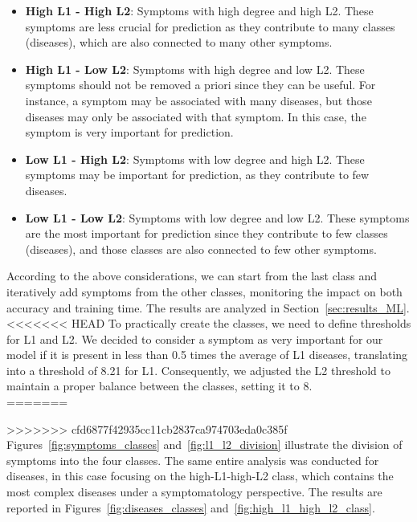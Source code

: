 \begin{itemize}
    \setlength\itemsep{1em}
    \item \textbf{High L1 - High L2}: Symptoms with high degree and high L2. These symptoms are less crucial for
          prediction as they contribute to many classes (diseases), which are also connected to many other symptoms.
    \item \textbf{High L1 - Low L2}: Symptoms with high degree and low L2. These symptoms should not be removed a
          priori since they can be useful. For instance, a symptom may be associated with many diseases, but those
          diseases may only be associated with that symptom. In this case, the symptom is very important for prediction.
    \item \textbf{Low L1 - High L2}: Symptoms with low degree and high L2. These symptoms may be important for
          prediction, as they contribute to few diseases.
    \item \textbf{Low L1 - Low L2}: Symptoms with low degree and low L2. These symptoms are the most important
          for prediction since they contribute to few classes (diseases), and those classes are also connected to
          few other symptoms.
\end{itemize}

\noindent
According to the above considerations, we can start from the last class and iteratively add symptoms from the
other classes, monitoring the impact on both accuracy and training time.
The results are analyzed in Section~\ref{sec:results_ML}.\\
<<<<<<< HEAD
To practically create the classes, we need to define thresholds for L1 and L2. We decided to consider
a symptom as very important for our model if it is present in less than 0.5 times the average of L1 diseases,
translating into a threshold of 8.21 for L1. Consequently, we adjusted the L2 threshold to maintain a proper balance
between the classes, setting it to 8.\\
=======

>>>>>>> cfd6877f42935cc11cb2837ca974703eda0c385f
Figures~\ref{fig:symptoms_classes} and~\ref{fig:l1_l2_division} illustrate the division of symptoms into the four classes.
The same entire analysis was conducted for diseases, in this case focusing on the high-L1-high-L2 class, which contains
the most complex diseases under a symptomatology perspective. The results are reported in Figures~\ref{fig:diseases_classes}
and~\ref{fig:high_l1_high_l2_class}.\\


